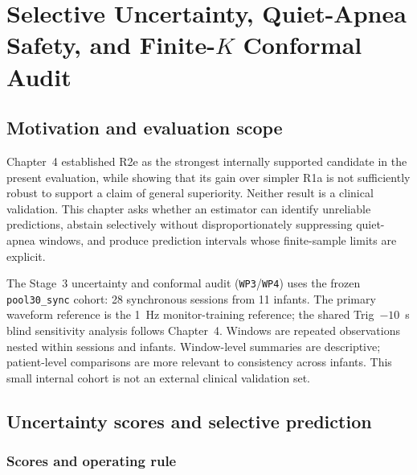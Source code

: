 \chapter{Selective Uncertainty, Quiet-Apnea Safety, and Finite-\texorpdfstring{$K$}{K} Conformal Audit}
\label{ch:uncertainty_conformal}

\section{Motivation and evaluation scope}

Chapter~4 established R2e as the strongest internally supported candidate in the present evaluation, while showing that its gain over simpler R1a is not sufficiently robust to support a claim of general superiority. Neither result is a clinical validation. This chapter asks whether an estimator can identify unreliable predictions, abstain selectively without disproportionately suppressing quiet-apnea windows, and produce prediction intervals whose finite-sample limits are explicit.

The Stage~3 uncertainty and conformal audit (\texttt{WP3}/\texttt{WP4}) uses the frozen \texttt{pool30\_sync} cohort: 28 synchronous sessions from 11 infants. The primary waveform reference is the 1~Hz monitor-training reference; the shared Trig~$-10$~s blind sensitivity analysis follows Chapter~4. Windows are repeated observations nested within sessions and infants. Window-level summaries are descriptive; patient-level comparisons are more relevant to consistency across infants. This small internal cohort is not an external clinical validation set.

\section{Uncertainty scores and selective prediction}
\label{sec:ch5_selective}

\subsection{Scores and operating rule}

